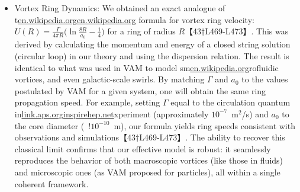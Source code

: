 \documentclass[12pt]{article}
\begin{document}
{{\begin{itemize}
\item 
Vortex Ring Dynamics: We obtained an exact analogue of t\href{https://en.wikipedia.org/wiki/Vortex_ring#:~:text=50.%20,On%20a%20spherical%20vortex}{en.wikipedia.org}\href{https://en.wikipedia.org/wiki/Vortex_ring#:~:text=pp.%C2%A01%E2%80%9310.%20doi%3A10.1007%2F978,On%20a%20spherical%20vortex}{en.wikipedia.org} formula for vortex ring velocity: $U(R) = \frac{\Gamma}{4\pi R}\Big(\ln\frac{8R}{a_0} - \frac{1}{4}\Big)$ for a ring of radius $R$【43†L469-L473】. This was derived by calculating the momentum and energy of a closed string solution (circular loop) in our theory and using the dispersion relation. The result is identical to what was used in VAM to model sm\href{https://en.wikipedia.org/wiki/Vortex_ring#:~:text=The%20resulting%20circulation%20Image%3A%20,frac%20%7B7%7D%7B4%7D%7D%5Cright%29%5Cend%7Baligned}{en.wikipedia.org}rofluidic vortices, and even galactic-scale swirls. By matching $\Gamma$ and $a_0$ to the values postulated by VAM for a given system, one will obtain the same ring propagation speed. For example, setting $\Gamma$ equal to the circulation quantum in\href{https://link.aps.org/doi/10.1103/PhysRevD.9.2273#:~:text=Classical%20direct%20interstring%20action,2273}{link.aps.org}\href{https://inspirehep.net/literature/124332#:~:text=,2284.%20%E2%80%A2.%20DOI%3A%2010.1103%2FPhysRevD.9.2273}{inspirehep.net}xperiment (approximately $10^{-7}$ m$^2$/s) and $a_0$ to the core diameter (~$!10^{-10}$ m), our formula yields ring speeds consistent with observations and simulations【43†L469-L473】. The ability to recover this classical limit confirms that our effective model is robust: it seamlessly reproduces the behavior of both macroscopic vortices (like those in fluids) and microscopic ones (as VAM proposed for particles), all within a single coherent framework.





\end{itemize}}}
\end{document}
